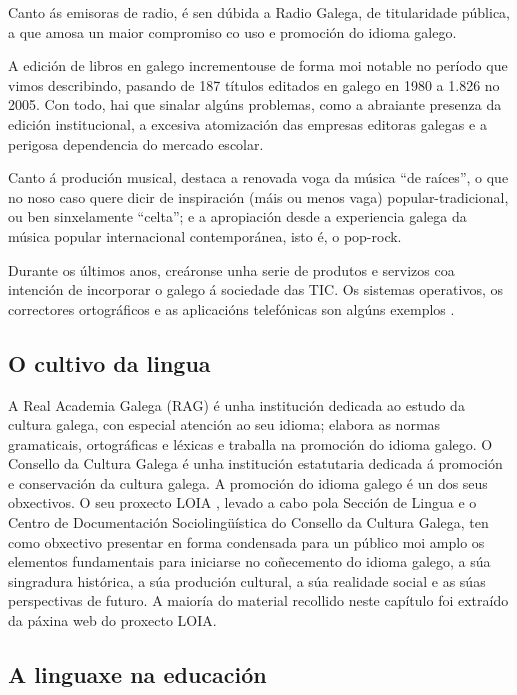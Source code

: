 \begin{multicols}{2}
Canto ás emisoras de radio, é sen dúbida a Radio Galega, de titularidade pública, a que amosa un maior compromiso co uso e promoción do idioma galego. 

A edición de libros en galego incrementouse de forma moi notable no período que vimos describindo, pasando de 187 títulos editados en galego en 1980 a 1.826 no 2005. Con todo, hai que sinalar algúns problemas, como a abraiante presenza da edición institucional, a excesiva atomización das empresas editoras galegas e a perigosa dependencia do mercado escolar. 

Canto á produción musical, destaca a renovada voga da música “de raíces”, o que no noso caso quere dicir de inspiración (máis ou menos vaga) popular-tradicional, ou ben sinxelamente “celta”; e a apropiación desde a experiencia galega da música popular internacional contemporánea, isto é, o pop-rock.

Durante os últimos anos, creáronse unha serie de produtos e servizos coa intención de incorporar o galego á sociedade das TIC. Os sistemas operativos, os correctores ortográficos e as aplicacións telefónicas son algúns exemplos \cite{GAL-Nota10}.

\subsection{O cultivo da lingua}

    A Real Academia Galega (RAG) \cite{GAL-Nota11} é unha institución dedicada ao estudo da cultura galega, con especial atención ao seu idioma; elabora as normas gramaticais, ortográficas e léxicas e traballa na promoción do idioma galego. 
O Consello da Cultura Galega \cite{GAL-Nota6} é unha institución estatutaria dedicada á promoción e conservación da cultura galega. A promoción do idioma galego é un dos seus obxectivos. O seu proxecto LOIA \cite{GAL-Nota7}, levado a cabo pola Sección de Lingua e o Centro de Documentación Sociolingüística do Consello da Cultura Galega, ten como obxectivo presentar en forma condensada para un público moi amplo os elementos fundamentais para iniciarse no coñecemento do idioma galego, a súa singradura histórica, a súa produción cultural, a súa realidade social e as súas perspectivas de futuro. A maioría do material recollido neste capítulo foi extraído da páxina web do proxecto LOIA.

 

\subsection{A linguaxe na educación}


\end{multicols}
